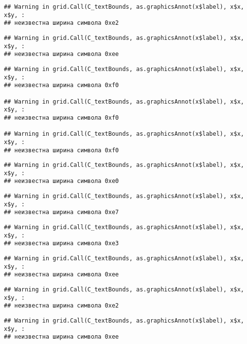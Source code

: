 \documentclass[
]{article}
\begin{document}
\begin{verbatim}
## Warning in grid.Call(C_textBounds, as.graphicsAnnot(x$label), x$x, x$y, :
## неизвестна ширина символа 0xe2
\end{verbatim}

\begin{verbatim}
## Warning in grid.Call(C_textBounds, as.graphicsAnnot(x$label), x$x, x$y, :
## неизвестна ширина символа 0xee
\end{verbatim}

\begin{verbatim}
## Warning in grid.Call(C_textBounds, as.graphicsAnnot(x$label), x$x, x$y, :
## неизвестна ширина символа 0xf0

## Warning in grid.Call(C_textBounds, as.graphicsAnnot(x$label), x$x, x$y, :
## неизвестна ширина символа 0xf0

## Warning in grid.Call(C_textBounds, as.graphicsAnnot(x$label), x$x, x$y, :
## неизвестна ширина символа 0xf0
\end{verbatim}

\begin{verbatim}
## Warning in grid.Call(C_textBounds, as.graphicsAnnot(x$label), x$x, x$y, :
## неизвестна ширина символа 0xe0
\end{verbatim}

\begin{verbatim}
## Warning in grid.Call(C_textBounds, as.graphicsAnnot(x$label), x$x, x$y, :
## неизвестна ширина символа 0xe7
\end{verbatim}

\begin{verbatim}
## Warning in grid.Call(C_textBounds, as.graphicsAnnot(x$label), x$x, x$y, :
## неизвестна ширина символа 0xe3
\end{verbatim}

\begin{verbatim}
## Warning in grid.Call(C_textBounds, as.graphicsAnnot(x$label), x$x, x$y, :
## неизвестна ширина символа 0xee
\end{verbatim}

\begin{verbatim}
## Warning in grid.Call(C_textBounds, as.graphicsAnnot(x$label), x$x, x$y, :
## неизвестна ширина символа 0xe2
\end{verbatim}

\begin{verbatim}
## Warning in grid.Call(C_textBounds, as.graphicsAnnot(x$label), x$x, x$y, :
## неизвестна ширина символа 0xee
\end{verbatim}
\end{document}
